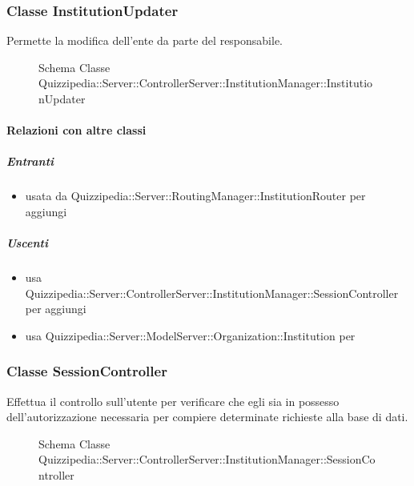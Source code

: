 \subsubsection{Classe InstitutionUpdater}
Permette la modifica dell'ente da parte del responsabile.
\begin{figure}[H]
\centering
\noindent{}
\caption[Schema Classe InstitutionUpdater]{Schema Classe Quizzipedia::Server::ControllerServer::InstitutionManager::InstitutionUpdater}
\end{figure}
\paragraph{Relazioni con altre classi}
\subparagraph{Entranti}
\begin{itemize}
\item usata da Quizzipedia::Server::RoutingManager::InstitutionRouter per aggiungi
\end{itemize}
\subparagraph{Uscenti}
\begin{itemize}
\item usa Quizzipedia::Server::ControllerServer::InstitutionManager::SessionController per aggiungi
\item usa Quizzipedia::Server::ModelServer::Organization::Institution per 
\end{itemize}
\subsubsection{Classe SessionController}
Effettua il controllo sull'utente per verificare che egli sia in possesso dell'autorizzazione necessaria per compiere determinate richieste alla base di dati.
\begin{figure}[H]
\centering
\noindent{}
\caption[Schema Classe SessionController]{Schema Classe Quizzipedia::Server::ControllerServer::InstitutionManager::SessionController}
\end{figure}
